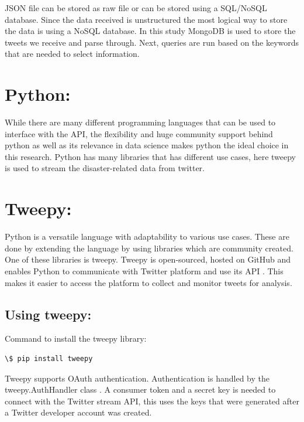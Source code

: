 JSON file can be stored as raw file or can be stored using a SQL/NoSQL database. Since the data received is unstructured the most logical way to store the data is using a NoSQL database. In this study MongoDB is used to store the tweets we receive and parse through. Next, queries are run based on the keywords that are needed to select information.

\section{Python:}

While there are many different programming languages that can be used to interface with the API, the flexibility and huge community support behind python as well as its relevance in data science makes python the ideal choice in this research. Python has many libraries that has different use cases, here tweepy is used to stream the disaster-related data from twitter.

\section{Tweepy:}

Python is a versatile language with adaptability to various use cases. These are done by extending the language by using libraries which are community created. One of these libraries is tweepy. Tweepy is open-sourced, hosted on GitHub and enables Python to communicate with Twitter platform and use its API \cite{tweepypython}. This makes it easier to access the platform to collect and monitor tweets for analysis.

\subsection{Using tweepy:}

Command to install the tweepy library:

\hfill

\begin{lstlisting}
\$ pip install tweepy
\end{lstlisting}

Tweepy supports OAuth authentication. Authentication is handled by the \\ tweepy.AuthHandler class \cite{tweepyauth}.
A consumer token and a secret key is needed to connect with the Twitter stream API, this uses the keys that were generated after a Twitter developer account was created.

